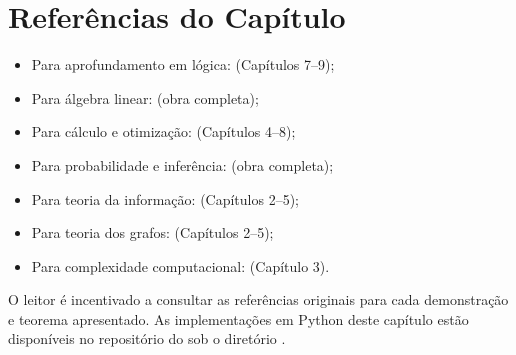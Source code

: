 \section*{Referências do Capítulo}
\begin{itemize}
\item Para aprofundamento em lógica: \cite{russell2020inteligencia}
(Capítulos 7--9);
\item Para álgebra linear: \cite{strang2016algebra}
(obra completa);
\item Para cálculo e otimização: \cite{goodfellow2016deep}
(Capítulos 4--8);
\item Para probabilidade e inferência: \cite{wasserman2004all}
(obra completa);
\item Para teoria da informação: \cite{cover2006elements}
(Capítulos 2--5);
\item Para teoria dos grafos: \cite{barabasi2016network}
(Capítulos 2--5);
\item Para complexidade computacional: \cite{russell2020inteligencia}
(Capítulo 3).
\end{itemize}
\begin{observacao}
O leitor é incentivado a consultar as referências originais para cada
demonstração e teorema apresentado. As implementações em Python deste
capítulo estão disponíveis no repositório do \opencodeeco{} sob o
diretório .
\end{observacao}
